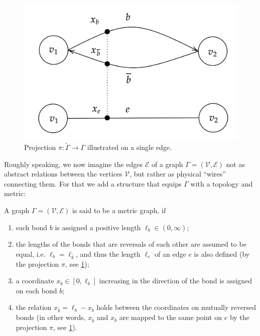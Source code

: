 \begin{figure}[H]
    \begin{center}
        \includegraphics[scale=0.2]{img/diagram-20220201_3.png}
    \end{center}
    \caption{Projection $\pi \colon \widetilde{\Gamma} \to \Gamma$ illustrated on a single edge.}
    \label{fig3}
\end{figure}

Roughly speaking, we now imagine the edges $\mathcal{E}$ of a graph $\Gamma = (\mathcal{V}, \mathcal{E})$ not as abstract relations between the vertices $\mathcal{V}$, but rather as physical “wires” connecting them. For that we add a structure that equips $\Gamma$ with a topology and metric:

\begin{definition}
    \label{metric graph}
    A graph $\Gamma = (\mathcal{V}, \mathcal{E})$ is said to be a metric graph, if 
    \begin{enumerate}
        \item each bond $b$ is assigned a positive length $\ell_b \in (0, \infty)$;
        \item the lengths of the bonds that are reversals of each other are assumed to be equal, i.e. $\ell_b = \ell_{\overline{b}}$, and thus the length $\ell_e$ of an edge $e$ is also defined (by the projection $\pi$, see \cref{fig3});
        \item a coordinate $x_b \in [0, \ell_b]$ increasing in the direction of the bond is assigned on each bond $b$;
        \item the relation $x_{\overline{b}} = \ell_b − x_b$ holds between the coordinates on mutually reversed bonds (in other words, $x_{\overline{b}}$ and $x_b$ are mapped to the same point on $e$ by the projection $\pi$, see \cref{fig3}).
    \end{enumerate}
\end{definition}

